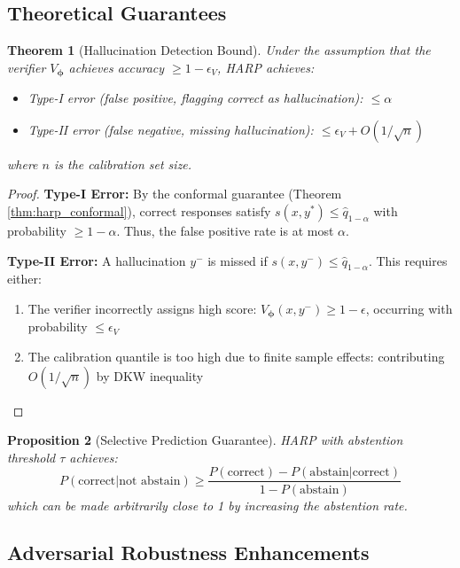 \documentclass[11pt,a4paper]{article}
\newtheorem{theorem}{Theorem}[section]
\newtheorem{proposition}[theorem]{Proposition}
\newcommand{\bphi}{\bm{\phi}}
\begin{document}
\subsection{Theoretical Guarantees}

\begin{theorem}[Hallucination Detection Bound]
\label{thm:harp_detection}
Under the assumption that the verifier $V_\bphi$ achieves accuracy $\geq 1-\epsilon_V$, HARP achieves:
\begin{itemize}
    \item Type-I error (false positive, flagging correct as hallucination): $\leq \alpha$
    \item Type-II error (false negative, missing hallucination): $\leq \epsilon_V + O(1/\sqrt{n})$
\end{itemize}
where $n$ is the calibration set size.
\end{theorem}

\begin{proof}
\textbf{Type-I Error:} By the conformal guarantee (Theorem \ref{thm:harp_conformal}), correct responses satisfy $s(x, y^*) \leq \hat{q}_{1-\alpha}$ with probability $\geq 1-\alpha$. Thus, the false positive rate is at most $\alpha$.

\textbf{Type-II Error:} A hallucination $y^-$ is missed if $s(x, y^-) \leq \hat{q}_{1-\alpha}$. This requires either:
\begin{enumerate}
    \item The verifier incorrectly assigns high score: $V_\bphi(x, y^-) \geq 1 - \epsilon$, occurring with probability $\leq \epsilon_V$
    \item The calibration quantile is too high due to finite sample effects: contributing $O(1/\sqrt{n})$ by DKW inequality
\end{enumerate}
\end{proof}

\begin{proposition}[Selective Prediction Guarantee]
\label{prop:harp_selective}
HARP with abstention threshold $\tau$ achieves:
\begin{equation}
    P(\text{correct} | \text{not abstain}) \geq \frac{P(\text{correct}) - P(\text{abstain} | \text{correct})}{1 - P(\text{abstain})}
\end{equation}
which can be made arbitrarily close to 1 by increasing the abstention rate.
\end{proposition}

\subsection{Adversarial Robustness Enhancements}
\end{document}
